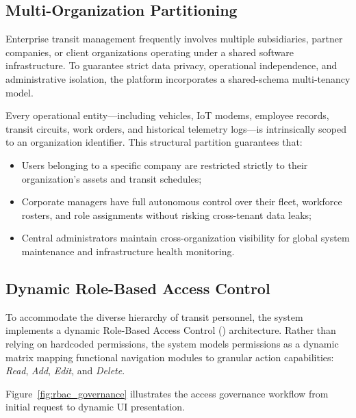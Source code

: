 \subsection{Multi-Organization Partitioning}
Enterprise transit management frequently involves multiple subsidiaries, partner companies, or client organizations operating under a shared software infrastructure. To guarantee strict data privacy, operational independence, and administrative isolation, the platform incorporates a shared-schema multi-tenancy model.

Every operational entity---including vehicles, IoT modems, employee records, transit circuits, work orders, and historical telemetry logs---is intrinsically scoped to an organization identifier. This structural partition guarantees that:
\begin{itemize}
  \item Users belonging to a specific company are restricted strictly to their organization's assets and transit schedules;
  \item Corporate managers have full autonomous control over their fleet, workforce rosters, and role assignments without risking cross-tenant data leaks;
  \item Central administrators maintain cross-organization visibility for global system maintenance and infrastructure health monitoring.
\end{itemize}

\subsection{Dynamic Role-Based Access Control}
To accommodate the diverse hierarchy of transit personnel, the system implements a dynamic Role-Based Access Control () architecture. Rather than relying on hardcoded permissions, the system models permissions as a dynamic matrix mapping functional navigation modules to granular action capabilities: \emph{Read}, \emph{Add}, \emph{Edit}, and \emph{Delete}.

Figure~\ref{fig:rbac_governance} illustrates the access governance workflow from initial request to dynamic UI presentation.

